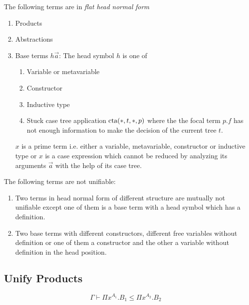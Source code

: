 The following terms are in \emph{flat head normal form}
\begin{enumerate}
    \item Products

    \item Abstractions

    \item Base terms $h \vec a$: The head symbol $h$ is one of
        \begin{enumerate}
            \item Variable or metavariable
            \item Constructor
            \item Inductive type
            \item Stuck case tree application ${\text{cta}}(*, t, *, p)$
                where the the focal term $p.f$ has not enough information to
                make the decision of the current tree $t$.
        \end{enumerate}


        $x$ is a prime term i.e. either a variable,
        metavariable, constructor or inductive type or $x$ is a case expression
        which cannot be reduced by analyzing its arguments $\vec a$ with the help
        of its case tree.
\end{enumerate}

The following terms are not unifiable:
\begin{enumerate}
    \item Two terms in head normal form of different structure are mutually not
        unifiable except one of them is a base term with a head symbol which has
        a definition.

    \item Two base terms with different constructors, different free variables
        without definition or one of them a constructor and the other a variable
        without definition in the head position.
\end{enumerate}





\subsection{Unify Products}

$$
    \Gamma \vdash \Pi x^{A_1}. B_1 \le \Pi x^{A_2}. B_2
$$


